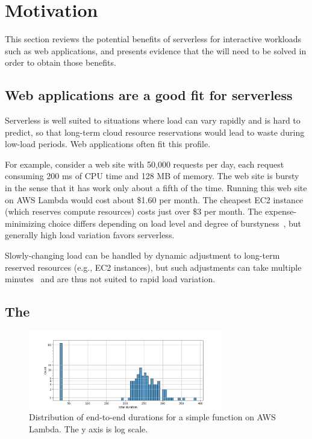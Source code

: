 \section{Motivation}\label{s:motivation}

This section reviews the potential benefits of serverless for
interactive workloads such as web applications, and presents
evidence that the {\problem} will need to be solved in order to
obtain those benefits.

\subsection{Web applications are a good fit for serverless}

Serverless is well suited to situations where load can vary rapidly
and is hard to predict, so that long-term cloud resource reservations
would lead to waste during low-load periods. Web applications often
fit this profile.

For example, consider a web site with 50,000 requests per day, each
request consuming 200 ms of CPU time and 128 MB of memory. The web
site is bursty in the sense that it has work only about a fifth of the
time. Running this web site on AWS Lambda would cost about \$1.60 per
month. The cheapest EC2 instance (which reserves compute resources)
costs just over \$3 per month. The expense-minimizing choice differs
depending on load level and degree of
burstyness~\cite{econ-of-serverless,trek10-blog},
but generally high load variation favors serverless.

Slowly-changing load can be handled by dynamic adjustment to long-term
reserved resources (e.g., EC2 instances), but such adjustments can take
multiple minutes~\cite{ec2-autoscaling} and are thus not suited to
rapid load variation.

\subsection{The \problem{}}

\begin{figure}[t!]
    \centering
      \includegraphics[width=8.5cm]{img/lambda_total_durations.png}
      \caption{Distribution of end-to-end durations for a simple function on AWS Lambda. The y axis is log scale. }
    \label{fig:lambda-total-durations}
\end{figure}

